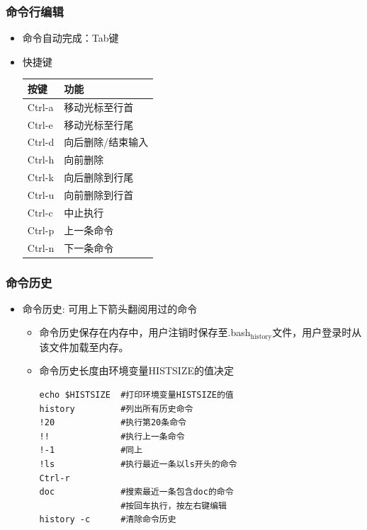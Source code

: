 \documentclass[xcolor=svgnames,presentation]{beamer}
\begin{document}
\begin{frame}
\frametitle{命令行编辑}
\label{sec-4-3-6}
\begin{itemize}

\item 命令自动完成：Tab键
\label{sec-4-3-6-1}%

\item 快捷键\\
\label{sec-4-3-6-2}%
\begin{center}
\begin{tabular}{ll}
 按键    &  功能               \\
\hline
 Ctrl-a  &  移动光标至行首     \\
 Ctrl-e  &  移动光标至行尾     \\
 Ctrl-d  &  向后删除/结束输入  \\
 Ctrl-h  &  向前删除           \\
 Ctrl-k  &  向后删除到行尾     \\
 Ctrl-u  &  向前删除到行首     \\
 Ctrl-c  &  中止执行           \\
 Ctrl-p  &  上一条命令         \\
 Ctrl-n  &  下一条命令         \\
\end{tabular}
\end{center}


\end{itemize} %
\end{frame}
\begin{frame}[fragile]
\frametitle{命令历史}
\label{sec-4-3-7}
\begin{itemize}

\item 命令历史: 可用上下箭头翻阅用过的命令
\label{sec-4-3-7-1}%
\begin{itemize}

\item 命令历史保存在内存中，用户注销时保存至.bash$_{\mathrm{history}}$文件，用户登录时从该文件加载至内存。
\label{sec-4-3-7-1-1}%

\item 命令历史长度由环境变量HISTSIZE的值决定\\
\label{sec-4-3-7-1-2}%
\begin{verbatim}
echo $HISTSIZE  #打印环境变量HISTSIZE的值
history         #列出所有历史命令
!20             #执行第20条命令
!!              #执行上一条命令
!-1             #同上
!ls             #执行最近一条以ls开头的命令
Ctrl-r
doc             #搜索最近一条包含doc的命令
                #按回车执行，按左右键编辑
history -c      #清除命令历史
\end{verbatim}
\end{itemize} %
\end{itemize} %
\end{frame}
\end{document}
